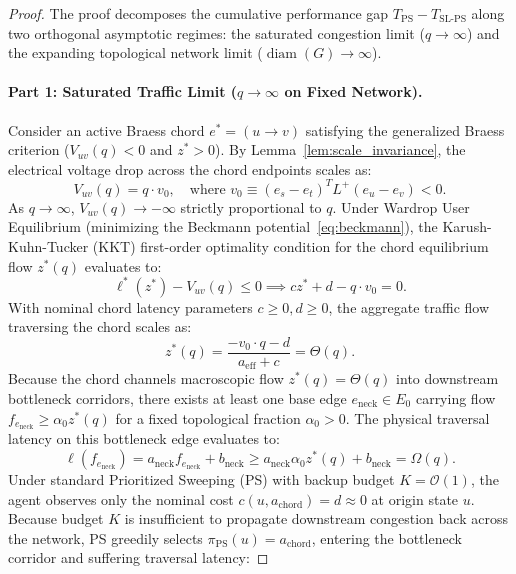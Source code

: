 \documentclass[11pt,a4paper]{article}
\begin{document}
\begin{proof}
The proof decomposes the cumulative performance gap $T_{\text{PS}} - T_{\text{SL-PS}}$ along two orthogonal asymptotic regimes: the saturated congestion limit ($q \to \infty$) and the expanding topological network limit ($\operatorname{diam}(G) \to \infty$).

\paragraph{Part 1: Saturated Traffic Limit ($q \to \infty$ on Fixed Network).}
Consider an active Braess chord $e^* = (u \to v)$ satisfying the generalized Braess criterion ($V_{uv}(q) < 0$ and $z^* > 0$). By Lemma~\ref{lem:scale_invariance}, the electrical voltage drop across the chord endpoints scales as:
\begin{equation}
V_{uv}(q) = q \cdot v_0, \quad \text{where } v_0 \equiv (e_s - e_t)^T L^+ (e_u - e_v) < 0.
\end{equation}
As $q \to \infty$, $V_{uv}(q) \to -\infty$ strictly proportional to $q$. Under Wardrop User Equilibrium (minimizing the Beckmann potential~\eqref{eq:beckmann}), the Karush-Kuhn-Tucker (KKT) first-order optimality condition for the chord equilibrium flow $z^*(q)$ evaluates to:
\begin{equation}
\ell^*(z^*) - V_{uv}(q) \le 0 \implies c z^* + d - q \cdot v_0 = 0.
\end{equation}
With nominal chord latency parameters $c \ge 0, d \ge 0$, the aggregate traffic flow traversing the chord scales as:
\begin{equation}
z^*(q) = \frac{-v_0 \cdot q - d}{a_{\text{eff}} + c} = \Theta(q).
\end{equation}
Because the chord channels macroscopic flow $z^*(q) = \Theta(q)$ into downstream bottleneck corridors, there exists at least one base edge $e_{\text{neck}} \in E_0$ carrying flow $f_{e_{\text{neck}}} \ge \alpha_0 z^*(q)$ for a fixed topological fraction $\alpha_0 > 0$. The physical traversal latency on this bottleneck edge evaluates to:
\begin{equation}
\ell(f_{e_{\text{neck}}}) = a_{\text{neck}} f_{e_{\text{neck}}} + b_{\text{neck}} \ge a_{\text{neck}} \alpha_0 z^*(q) + b_{\text{neck}} = \Omega(q).
\end{equation}
Under standard Prioritized Sweeping (PS) with backup budget $K = \mathcal{O}(1)$, the agent observes only the nominal cost $c(u, a_{\text{chord}}) = d \approx 0$ at origin state $u$. Because budget $K$ is insufficient to propagate downstream congestion back across the network, PS greedily selects $\pi_{\text{PS}}(u) = a_{\text{chord}}$, entering the bottleneck corridor and suffering traversal latency:

\end{proof}
\end{document}
